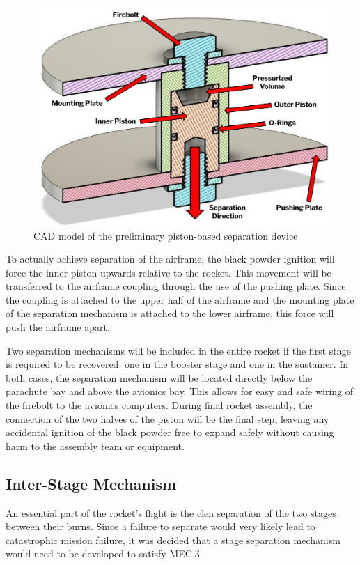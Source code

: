 \begin{figure}
    \centering
    \includegraphics[width=0.8\linewidth]{images/sep-cad}
    \caption{CAD model of the preliminary piston-based separation device}
    \label{figure:sep-cad}
\end{figure}

To actually achieve separation of the airframe, the black powder ignition will force the inner piston upwards relative to the rocket. This movement will be transferred to the airframe coupling through the use of the pushing plate. Since the coupling is attached to the upper half of the airframe and the mounting plate of the separation mechanism is attached to the lower airframe, this force will push the airframe apart.

Two separation mechanisms will be included in the entire rocket if the first stage is required to be recovered: one in the booster stage and one in the sustainer. In both cases, the separation mechanism will be located directly below the parachute bay and above the avionics bay. This allows for easy and safe wiring of the firebolt to the avionics computers. During final rocket assembly, the connection of the two halves of the piston will be the final step, leaving any accidental ignition of the black powder free to expand safely without causing harm to the assembly team or equipment.


\subsection{Inter-Stage Mechanism} \label{section:interstage-mech}

An essential part of the rocket's flight is the clen separation of the two stages between their burns. Since a failure to separate would very likely lead to catastrophic mission failure, it was decided that a stage separation mechanism would need to be developed to satisfy MEC.3.

